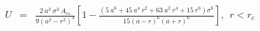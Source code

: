 


\begin{eqnarray}
	U &=& \frac{2 ~ a^3 ~ \sigma^3 ~ A_{cs}}{9 \left( a^2 - r^2 \right)^3} 
 \left[ 1 - \frac{\left(5 ~ a^6+45~a^4~r^2+63~a^2~r^4+15~r^6\right) \sigma^6}
 {15 \left(a-r\right)^6 \left( a+r \right)^6} \right], ~~ r < r_c \nonumber
\end{eqnarray}



